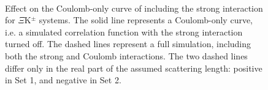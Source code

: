 \documentclass[/home/jesse/Analysis/FemtoAnalysis/AnalysisNotes/AnalysisNoteJBuxton.tex]{subfiles}
\begin{document}
\begin{figure}[h]
  \centering
  \\
  \caption[Effect of Strong Force Inclusion on Coulomb-Only Curve for $\Xi$K$^{\pm}$ systems]{Effect on the Coulomb-only curve of including the strong interaction for $\Xi$K$^{\pm}$ systems.  The solid line represents a Coulomb-only curve, i.e. a simulated correlation function with the strong interaction turned off.  The dashed lines represent a full simulation, including both the strong and Coulomb interactions.  The two dashed lines differ only in the real part of the assumed scattering length: positive in Set 1, and negative in Set 2.}
  \label{fig:XiKchStrongInfluence}
\end{figure}
\end{document}
